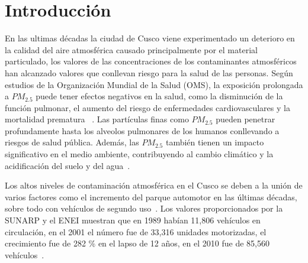 \documentclass[a4paper,11pt]{article}
\begin{document}
\section{Introducción}
En las ultimas décadas la ciudad de Cusco viene experimentado un deterioro en la calidad del aire atmosférica causado principalmente por el material particulado, los valores de las concentraciones de los contaminantes atmosféricos han alcanzado valores que conllevan
riesgo para la salud de las personas. Según estudios de la Organización Mundial de la Salud (OMS), la exposición prolongada a $PM_{2.5}$ puede tener efectos negativos en la salud, como la disminución de la función pulmonar, el aumento del riesgo de enfermedades cardiovasculares y la mortalidad prematura ~\cite{guias}. Las partículas finas como $PM_{2.5}$ pueden penetrar profundamente hasta los alveolos pulmonares de los humanos conllevando a riesgos de salud pública. Además, las $PM_{2.5}$ también tienen un impacto significativo en el medio ambiente, contribuyendo al cambio climático y la acidificación del suelo y del agua~\cite{Epa_2016}.

Los altos niveles de contaminación atmosférica en el Cusco se deben a la unión de varios factores como el incremento del parque automotor en las últimas décadas, sobre todo con vehículos de segundo uso~\cite{mora2018calidad}. Los valores proporcionados por la SUNARP y el ENEI muestran que en 1989 habían 11,806 vehículos
en circulación, en el 2001 el número fue de 33,316 unidades motorizadas, el crecimiento
fue de 282 \% en el lapso de 12 años, en el 2010 fue de 85,560 vehículos~\cite{mora2018calidad}.
\end{document}

